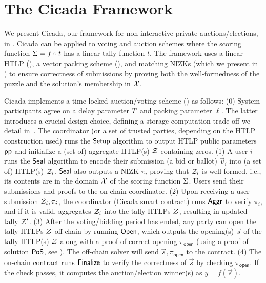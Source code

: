 \section{The Cicada Framework}\label{sec:cicada_framework}

We present Cicada, our framework for non-interactive private auctions/elections, in . Cicada can be applied to voting and auction schemes where the scoring function $\Sigma = f \circ t$ has a linear tally function $t$. The framework uses a linear HTLP (), a vector packing scheme (), and matching NIZKs (which we present in ) to ensure correctness of submissions by proving both the well-formedness of the puzzle and the solution's membership in $\mathcal{X}$.



Cicada implements a time-locked auction/voting scheme () as follows:
(0) System participants agree on a delay parameter $T$ and packing parameter $\ell$. The latter introduces a crucial design choice, defining a storage-computation trade-off we detail in~. The coordinator (or a set of trusted parties, depending on the HTLP construction used) runs the $\mathsf{Setup}$ algorithm to output HTLP public parameters $\mathsf{pp}$ and initialize a (set of) aggregate HTLP(s) $\mathcal{Z}$ containing zeros. 
(1) A user $i$ runs the $\mathsf{Seal}$ algorithm to encode their submission (a bid or ballot) $\vec{v}_i$ into (a set of) HTLP(s) $\mathcal{Z}_i$. $\mathsf{Seal}$ also outputs a NIZK $\pi_i$ proving that $\mathcal{Z}_i$ is well-formed, i.e., its contents are in the domain $\mathcal{X}$ of the scoring function $\Sigma$. Users send their submissions and proofs to the on-chain coordinator. 
(2) Upon receiving a user submission $\mathcal{Z}_i, \pi_i$, the coordinator (Cicada smart contract) runs $\mathsf{Aggr}$ to verify $\pi_i$, and if it is valid, aggregates $\mathcal{Z}_i$ into the tally HTLPs $\mathcal{Z}$, resulting in updated tally $\mathcal{Z}'$. 
(3) After the voting/bidding period has ended, any party can open the tally HTLPs $\mathcal{Z}$ off-chain by running $\mathsf{Open}$, which outputs the opening(s) $\vec{s}$ of the tally HTLP(s) $\mathcal{Z}$ along with a proof of correct opening $\pi_{\textsf{open}}$ (using a proof of solution ${\sf PoS}$, see ). The off-chain solver will send $\vec{s}, \pi_{\mathsf{open}}$ to the contract. 
(4) The on-chain contract runs $\mathsf{Finalize}$ to verify the correctness of $\vec{s}$ by checking $\pi_{\mathsf{open}}$. If the check passes, it computes the auction/election winner(s) as $y=f(\vec{s})$.

